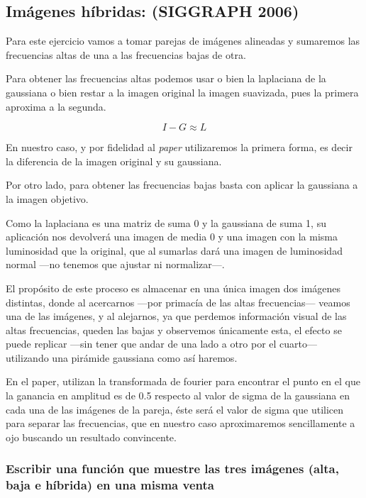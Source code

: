 \documentclass{article}
\newcommand{\img}[2]{
\noindent\makebox[\textwidth][c]{\texttt{[image: \#1]}}%
}
\begin{document}
\img{eximg/aliasing}{1}

\subsection{Imágenes híbridas: (SIGGRAPH 2006)}

Para este ejercicio vamos a tomar parejas de imágenes alineadas y sumaremos las frecuencias altas de una a las frecuencias bajas de otra. 

Para obtener las frecuencias altas podemos usar o bien la laplaciana de la gaussiana o bien restar a la imagen original la imagen suavizada, pues la primera aproxima a la segunda.

\[ I - G \approx L\]

\img{eximg/ej9_approx}{0.8}

En nuestro caso, y por fidelidad al \textit{paper} utilizaremos la primera forma, es decir la diferencia de la imagen original y su gaussiana.

Por otro lado, para obtener las frecuencias bajas basta con aplicar la gaussiana a la imagen objetivo. 

Como la laplaciana es una matriz de suma 0 y la gaussiana de suma 1, su aplicación nos devolverá una imagen de media 0 y una imagen con la misma luminosidad que la original, que al sumarlas dará una imagen de luminosidad normal ---no tenemos que ajustar ni normalizar---.

El propósito de este proceso es almacenar en una única imagen dos imágenes distintas, donde al acercarnos ---por primacía de las altas frecuencias--- veamos una de las imágenes, y al alejarnos, ya que perdemos información visual de las altas frecuencias, queden las bajas y observemos únicamente esta, el efecto se puede replicar ---sin tener que andar de una lado a otro por el cuarto--- utilizando una pirámide gaussiana como así haremos.

En el paper, utilizan la transformada de fourier para encontrar el punto en el que la ganancia en amplitud es de 0.5 respecto al valor de sigma de la gaussiana en cada una de las imágenes de la pareja, éste será el valor de sigma que utilicen para separar las frecuencias, que en nuestro caso aproximaremos sencillamente a ojo buscando un resultado convincente.

\subsubsection{Escribir una función que muestre las tres imágenes (alta, baja e híbrida) en una misma venta}
\end{document}
